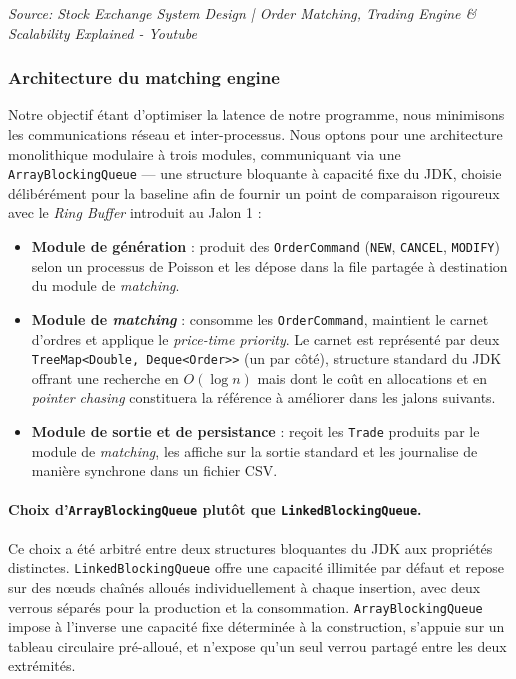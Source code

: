 \textit{Source: Stock Exchange System Design | Order Matching, Trading Engine \& Scalability Explained - Youtube}

\subsubsection{Architecture du matching engine}

Notre objectif étant d'optimiser la latence de notre programme, nous minimisons les communications réseau et inter-processus. Nous optons pour une architecture monolithique modulaire à trois modules, communiquant via une \texttt{ArrayBlockingQueue} --- une structure bloquante à capacité fixe du JDK, choisie délibérément pour la baseline afin de fournir un point de comparaison rigoureux avec le \textit{Ring Buffer} introduit au Jalon 1 :

\begin{itemize}
    \item \textbf{Module de génération} : produit des \texttt{OrderCommand} (\texttt{NEW}, \texttt{CANCEL}, \texttt{MODIFY}) selon un processus de Poisson et les dépose dans la file partagée à destination du module de \textit{matching}.
    \item \textbf{Module de \textit{matching}} : consomme les \texttt{OrderCommand}, maintient le carnet d'ordres et applique le \textit{price-time priority}. Le carnet est représenté par deux \texttt{TreeMap<Double, Deque<Order>>} (un par côté), structure standard du JDK offrant une recherche en $O(\log n)$ mais dont le coût en allocations et en \textit{pointer chasing} constituera la référence à améliorer dans les jalons suivants.
    \item \textbf{Module de sortie et de persistance} : reçoit les \texttt{Trade} produits par le module de \textit{matching}, les affiche sur la sortie standard et les journalise de manière synchrone dans un fichier CSV.
\end{itemize}

\paragraph{Choix d'\texttt{ArrayBlockingQueue} plutôt que \texttt{LinkedBlockingQueue}.}

Ce choix a été arbitré entre deux structures bloquantes du JDK aux propriétés distinctes. \texttt{LinkedBlockingQueue} offre une capacité illimitée par défaut et repose sur des nœuds chaînés alloués individuellement à chaque insertion, avec deux verrous séparés pour la production et la consommation. \texttt{ArrayBlockingQueue} impose à l'inverse une capacité fixe déterminée à la construction, s'appuie sur un tableau circulaire pré-alloué, et n'expose qu'un seul verrou partagé entre les deux extrémités.

